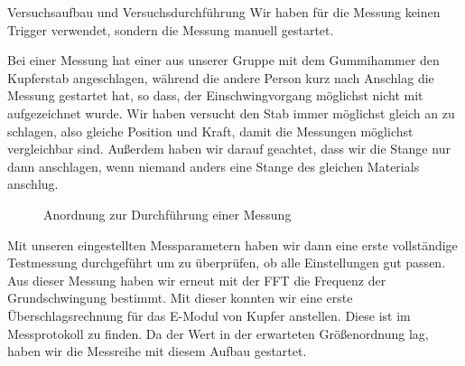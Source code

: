 \documentclass[twoside]{protokoll}
\begin{document}
\begin{aufgabe}{Versuchsaufbau und Versuchsdurchführung}
Wir haben für die Messung keinen Trigger verwendet, sondern die Messung manuell gestartet. 


Bei einer Messung hat einer aus unserer Gruppe mit dem Gummihammer den Kupferstab angeschlagen, während die andere Person kurz nach Anschlag die Messung gestartet hat, so dass, der Einschwingvorgang möglichst nicht mit aufgezeichnet wurde. Wir haben versucht den Stab immer möglichst gleich an zu schlagen, also gleiche Position und Kraft, damit die Messungen möglichst vergleichbar sind. Außerdem haben wir darauf geachtet, dass wir die Stange nur dann anschlagen, wenn niemand anders eine Stange des gleichen Materials anschlug.

\begin{figure}[H]
  \centering
  \hfill
  \caption{Anordnung zur Durchführung einer Messung}
\end{figure}



Mit unseren eingestellten Messparametern haben wir dann eine erste vollständige Testmessung durchgeführt um zu überprüfen, ob alle Einstellungen gut passen. Aus dieser Messung haben wir erneut mit der FFT die Frequenz der Grundschwingung bestimmt. Mit dieser konnten wir eine erste Überschlagsrechnung für das E-Modul von Kupfer anstellen.
Diese ist im Messprotokoll zu finden. Da der Wert in der erwarteten Größenordnung lag, haben wir die Messreihe mit diesem Aufbau gestartet. 



\end{aufgabe}
\end{document}
